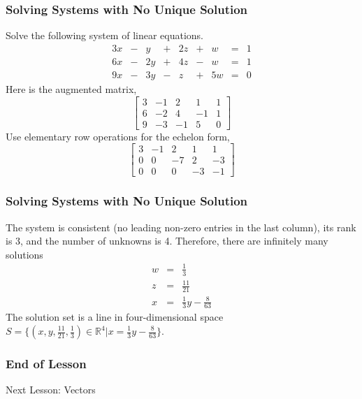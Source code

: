 \documentclass[xcolor=dvipsnames]{beamer}
\begin{document}
\begin{frame}
  \frametitle{Solving Systems with No Unique Solution}
  Solve the following system of linear equations.
  \begin{equation}
    \label{eq:lahpuwis}
    \begin{array}{ccccccccc}
      3x & - & y & + & 2z & + & w & = & 1 \\
      6x & - & 2y & + & 4z & - & w & = & 1 \\
      9x & - & 3y & - & z & + & 5w & = & 0
    \end{array}
  \end{equation}
  Here is the augmented matrix,
  \begin{equation}
    \label{eq:iecoyaem}
    \left[
      \begin{array}{ccccc}
        3 & -1 & 2 & 1 & 1 \\
        6 & -2 & 4 & -1 & 1 \\
        9 & -3 & -1 & 5 & 0
      \end{array}\right]
  \end{equation}
Use elementary row operations for the echelon form,
  \begin{equation}
    \label{eq:orieteeb}
    \left[
      \begin{array}{ccccc}
        3 & -1 & 2 & 1 & 1 \\
        0 & 0 & -7 & 2 & -3 \\
        0 & 0 & 0 & -3 & -1
      \end{array}\right]
  \end{equation}
\end{frame}

\begin{frame}
  \frametitle{Solving Systems with No Unique Solution}
  The system is consistent (no leading non-zero entries in the last
  column), its rank is 3, and the number of unknowns is 4. Therefore,
  there are infinitely many solutions
  \begin{equation}
    \label{eq:giekeati}
    \begin{array}{ccc}
      w&=&\frac{1}{3} \\
      z&=&\frac{11}{21} \\
      x&=&\frac{1}{3}y-\frac{8}{63}
    \end{array}
  \end{equation}
The solution set is a line in four-dimensional space $S=\{(x,y,\frac{11}{21},\frac{1}{3})\in\mathbb{R}^{4}\vert{}x=\frac{1}{3}y-\frac{8}{63}\}$.
\end{frame}

\begin{frame}
  \frametitle{End of Lesson}
Next Lesson: Vectors
\end{frame}
\end{document}
